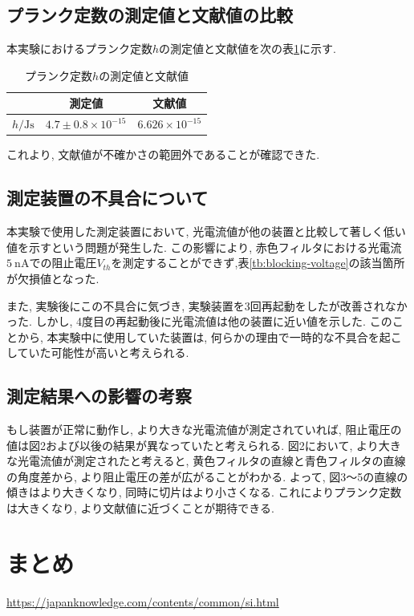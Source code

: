 \documentclass{jarticle}
\begin{document}
\subsection{プランク定数の測定値と文献値の比較}

本実験におけるプランク定数$h$の測定値と文献値を次の表\ref{tb:h-value}に示す.

\begin{table}[H]
  \centering
  \caption{プランク定数$h$の測定値と文献値}
  \label{tb:h-value}
  \begin{tabular}{ccc}
    \hline
    & 測定値 & 文献値\cite{SI} \\
    \hline
    $h/\mathrm{Js}$ & $4.7\pm0.8\times10^{-15}$ & $6.626\times10^{-15}$ \\
    \hline
  \end{tabular}
\end{table}

これより, 文献値が不確かさの範囲外であることが確認できた.



\subsection{測定装置の不具合について}

本実験で使用した測定装置において, 光電流値が他の装置と比較して著しく低い値を示すという問題が発生した.
この影響により, 赤色フィルタにおける光電流$5\ \mathrm{nA}$での阻止電圧$V_{th}$を測定することができず,表\ref{tb:blocking-voltage}の該当箇所が欠損値となった.

また, 実験後にこの不具合に気づき, 実験装置を3回再起動をしたが改善されなかった.
しかし, 4度目の再起動後に光電流値は他の装置に近い値を示した.
このことから, 本実験中に使用していた装置は, 何らかの理由で一時的な不具合を起こしていた可能性が高いと考えられる.



\subsection{測定結果への影響の考察}

もし装置が正常に動作し, より大きな光電流値が測定されていれば, 阻止電圧の値は図2および以後の結果が異なっていたと考えられる.
図2において, より大きな光電流値が測定されたと考えると, 黄色フィルタの直線と青色フィルタの直線の角度差から, より阻止電圧の差が広がることがわかる.
よって, 図3～5の直線の傾きはより大きくなり, 同時に切片はより小さくなる.
これによりプランク定数は大きくなり, より文献値に近づくことが期待できる.



\section{まとめ}



\begin{thebibliography}{99}

   \url{https://japanknowledge.com/contents/common/si.html}

\end{thebibliography}
\end{document}
